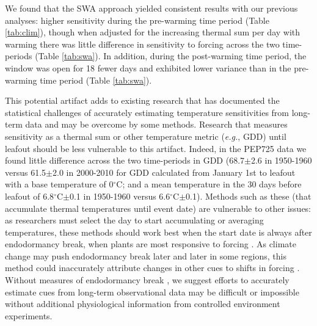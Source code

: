 \documentclass{article}
\begin{document}
\par We found that the SWA approach yielded consistent results with our previous analyses: higher sensitivity during the pre-warming time period (Table \ref{tab:clim}), though when adjusted for the increasing thermal sum per day with warming there was little difference in sensitivity to forcing across the two time-periods (Table \ref{tab:swa}). In addition, during the post-warming time period, the window was open for 18 fewer days and exhibited lower variance than in the pre-warming time period (Table \ref{tab:swa}). 

\par This potential artifact adds to existing research that has documented the statistical challenges of accurately estimating temperature sensitivities from long-term data \emph{\citep{gusewell2017,clark2014a}} and may be overcome by some methods. Research that measures sensitivity as a thermal sum or other temperature metric (\emph{e.g.}, GDD) until leafout should be less vulnerable to this artifact. Indeed, in the PEP725 data we found little difference across the two time-periods in GDD (68.7$\pm$2.6 in 1950-1960 versus 61.5$\pm$2.0 in 2000-2010 for GDD calculated from January 1st to leafout with a base temperature of 0$^{\circ}$C; and a mean temperature in the 30 days before leafout of 6.8$^{\circ}$C$\pm$0.1 in 1950-1960 versus 6.6$^{\circ}$C$\pm$0.1). Methods such as these (that accumulate thermal temperatures until event date) are vulnerable to other issues: as researchers must select the day to start accumulating or averaging temperatures, these methods should work best when the start date is always after endodormancy break, when plants are most responsive to forcing \emph{\citep{chuine2016}}. As climate change may push endodormancy break later and later in some regions, this method could inaccurately attribute changes in other cues to shifts in forcing \emph{\citep{gusewell2017}}. Without measures of endodormancy break \emph{\citep{chuine2016}}, we suggest efforts to accurately estimate cues from long-term observational data may be difficult or impossible without additional physiological information from controlled environment experiments.



\newpage

\newpage
\end{document}
